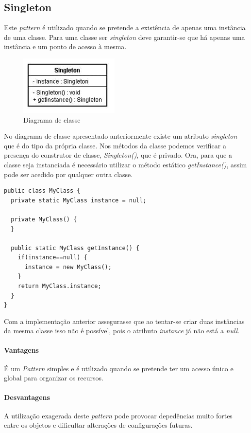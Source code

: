 \subsection{Singleton}


Este \textit{pattern} é utilizado quando se pretende a existência de apenas uma instância de uma classe. Para uma classe ser \textit{singleton} deve garantir-se que há apenas uma instância e um ponto de acesso à mesma.

\begin{figure}[!h]
\centering
\includegraphics[scale=.9]{img/singleton-diagrama}
\caption{Diagrama de classe}
\end{figure}

No diagrama de classe apresentado anteriormente existe um atributo \textit{singleton} que é do tipo da própria classe. Nos métodos da classe podemos verificar a presença do construtor de classe, \textit{Singleton()}, que é privado. Ora, para que a classe seja instanciada é necessário utilizar o método estático \textit{getInstance()}, assim pode ser acedido por qualquer outra classe.

\begin{lstlisting}[caption=Solução de implementação]
public class MyClass {
  private static MyClass instance = null;

  private MyClass() {
  }

  public static MyClass getInstance() {
    if(instance==null) {
      instance = new MyClass();
    }
    return MyClass.instance;
  }
}
\end{lstlisting}

Com a implementação anterior assegurasse que ao tentar-se criar duas instâncias da mesma classe isso não é possível, pois o atributo \textit{instance} já não está a \textit{null}.

\paragraph{Vantagens}

É um \textit{Pattern} simples e é utilizado quando se pretende ter um acesso único e global para organizar os recursos.

\paragraph{Desvantagens}

A utilização exagerada deste \textit{pattern} pode provocar depedências muito fortes entre os objetos e dificultar alterações de configurações futuras.
